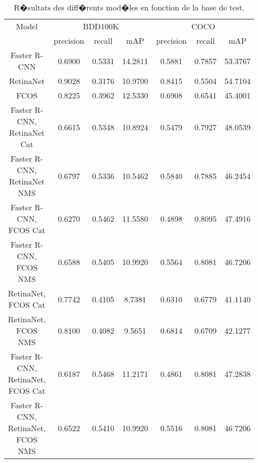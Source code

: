 \documentclass{article}
\begin{document}
\begin{table}[h!]
\centering
\begin{tabular}{|c||c|c|c|c|c|c|} 
\hline
Model & \multicolumn{3}{|c||}{BDD100K} & \multicolumn{3}{|c|}{COCO} \\ 
 & precision & recall & mAP  & precision & recall & mAP  \\ [0.5ex] 
\hline
Faster R-CNN & 0.6900 & 0.5331 &14.2811 & 0.5881 & 0.7857 & 53.3767 \\ 
\hline
RetinaNet & 0.9028 & 0.3176 & 10.9700 & 0.8415 & 0.5504 & 54.7104 \\ 
\hline
FCOS & 0.8225 & 0.3962 & 12.5330 & 0.6908 & 0.6541 & 45.4001 \\ 
\hline
Faster R-CNN, RetinaNet Cat & 0.6615 & 0.5348 & 10.8924 & 0.5479 & 0.7927 & 48.0539 \\ 
\hline
Faster R-CNN, RetinaNet NMS & 0.6797 & 0.5336 & 10.5462 & 0.5840 & 0.7885 & 46.2454 \\ 
\hline
Faster R-CNN, FCOS Cat & 0.6270 & 0.5462 & 11.5580 & 0.4898 & 0.8095 & 47.4916 \\ 
\hline
Faster R-CNN, FCOS NMS & 0.6588 & 0.5405 & 10.9920 & 0.5564 & 0.8081 & 46.7206 \\ 
\hline
RetinaNet, FCOS Cat & 0.7742 & 0.4105 & 8.7381 & 0.6310 & 0.6779 & 41.1140 \\ 
\hline
RetinaNet, FCOS NMS & 0.8100 & 0.4082 & 9.5651 & 0.6814 & 0.6709 & 42.1277 \\ 
\hline
Faster R-CNN, RetinaNet, FCOS Cat & 0.6187 & 0.5468 & 11.2171 & 0.4861 & 0.8081 & 47.2838 \\ 
\hline
Faster R-CNN, RetinaNet, FCOS NMS & 0.6522 & 0.5410 & 10.9920 & 0.5516 & 0.8081 & 46.7206 \\ 
\hline
\end{tabular}
\caption{R�sultats des diff�rents mod�les en fonction de la base de test.}
\label{table:data}
\end{table}
\end{document}
